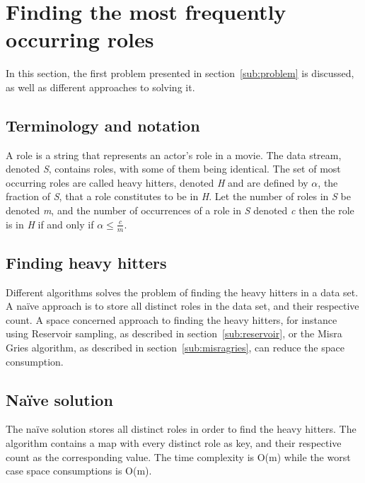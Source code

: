 
\section{Finding the most frequently occurring roles}
In this section, the first problem presented in section~\ref{sub:problem} is discussed, as well as different approaches to solving it.\cite{reservoir}

\subsection{Terminology and notation}
A role is a string that represents an actor’s role in a movie. The data stream, denoted \textit{S}, contains roles, with some of them being identical. The set of most occurring roles are called heavy hitters, denoted \textit{H} and are defined by \(\alpha\), the fraction of \textit{S}, that a role constitutes to be in \textit{H}.
Let the number of roles in \textit{S} be denoted \textit{m}, and the number of occurrences of a role in \textit{S} denoted \textit{c} then the role is in \textit{H} if and only if \(\alpha \le \frac{c}{m}\). %

\subsection{Finding heavy hitters}
Different algorithms solves the problem of finding the heavy hitters in a data set. A naïve approach is to store all distinct roles in the data set, and their respective count. A space concerned approach to finding the heavy hitters, for instance using Reservoir sampling, as described in section~\ref{sub:reservoir}, or the Misra Gries algorithm, as described in section~\ref{sub:misragries}, can reduce the space consumption.

\subsection{Naïve solution}
The naïve solution stores all distinct roles in order to find the heavy hitters. The algorithm contains a map with every distinct role as key, and their respective count as the corresponding value. The time complexity is O(m) while the worst case space consumptions is O(m).

